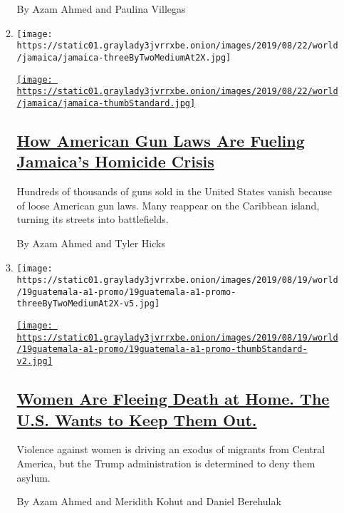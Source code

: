 \begin{enumerate}
\begin{enumerate}
    By Azam Ahmed and Paulina Villegas
  \item
    \texttt{[image: https://static01.graylady3jvrrxbe.onion/images/2019/08/22/world/jamaica/jamaica-threeByTwoMediumAt2X.jpg]}

    \href{/2019/08/25/world/americas/one-handgun-9-murders-how-american-firearms-cause-carnage-abroad.html}{\texttt{[image: https://static01.graylady3jvrrxbe.onion/images/2019/08/22/world/jamaica/jamaica-thumbStandard.jpg]}}

    \hypertarget{how-american-gun-laws-are-fueling-jamaicas-homicide-crisis}{%
    \subsection{\texorpdfstring{\href{/2019/08/25/world/americas/one-handgun-9-murders-how-american-firearms-cause-carnage-abroad.html}{How
    American Gun Laws Are Fueling Jamaica's Homicide
    Crisis}}{How American Gun Laws Are Fueling Jamaica's Homicide Crisis}}\label{how-american-gun-laws-are-fueling-jamaicas-homicide-crisis}}

    Hundreds of thousands of guns sold in the United States vanish
    because of loose American gun laws. Many reappear on the Caribbean
    island, turning its streets into battlefields.

    By Azam Ahmed and Tyler Hicks
  \item
    \texttt{[image: https://static01.graylady3jvrrxbe.onion/images/2019/08/19/world/19guatemala-a1-promo/19guatemala-a1-promo-threeByTwoMediumAt2X-v5.jpg]}

    \href{/2019/08/18/world/americas/guatemala-violence-women-asylum.html}{\texttt{[image: https://static01.graylady3jvrrxbe.onion/images/2019/08/19/world/19guatemala-a1-promo/19guatemala-a1-promo-thumbStandard-v2.jpg]}}

    \hypertarget{women-are-fleeing-death-at-home-the-us-wants-to-keep-them-out}{%
    \subsection{\texorpdfstring{\href{/2019/08/18/world/americas/guatemala-violence-women-asylum.html}{Women
    Are Fleeing Death at Home. The U.S. Wants to Keep Them
    Out.}}{Women Are Fleeing Death at Home. The U.S. Wants to Keep Them Out.}}\label{women-are-fleeing-death-at-home-the-us-wants-to-keep-them-out}}

    Violence against women is driving an exodus of migrants from Central
    America, but the Trump administration is determined to deny them
    asylum.

    By Azam Ahmed and Meridith Kohut and Daniel Berehulak
  \end{enumerate}
\end{enumerate}


